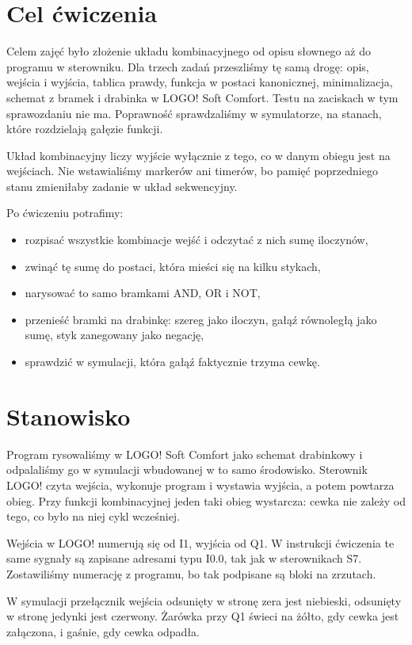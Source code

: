 \newpage
\section{Cel ćwiczenia}

Celem zajęć było złożenie układu kombinacyjnego od opisu słownego aż do programu w sterowniku. Dla trzech zadań przeszliśmy tę samą drogę: opis, wejścia i wyjścia, tablica prawdy, funkcja w postaci kanonicznej, minimalizacja, schemat z bramek i drabinka w LOGO! Soft Comfort. Testu na zaciskach w tym sprawozdaniu nie ma. Poprawność sprawdzaliśmy w symulatorze, na stanach, które rozdzielają gałęzie funkcji.

Układ kombinacyjny liczy wyjście wyłącznie z tego, co w danym obiegu jest na wejściach. Nie wstawialiśmy markerów ani timerów, bo pamięć poprzedniego stanu zmieniłaby zadanie w układ sekwencyjny.

Po ćwiczeniu potrafimy:

\begin{itemize}
    \item rozpisać wszystkie kombinacje wejść i odczytać z nich sumę iloczynów,
    \item zwinąć tę sumę do postaci, która mieści się na kilku stykach,
    \item narysować to samo bramkami AND, OR i NOT,
    \item przenieść bramki na drabinkę: szereg jako iloczyn, gałąź równoległą jako sumę, styk zanegowany jako negację,
    \item sprawdzić w symulacji, która gałąź faktycznie trzyma cewkę.
\end{itemize}

\section{Stanowisko}

Program rysowaliśmy w LOGO! Soft Comfort jako schemat drabinkowy i odpalaliśmy go w symulacji wbudowanej w to samo środowisko. Sterownik LOGO! czyta wejścia, wykonuje program i wystawia wyjścia, a potem powtarza obieg. Przy funkcji kombinacyjnej jeden taki obieg wystarcza: cewka nie zależy od tego, co było na niej cykl wcześniej.

Wejścia w LOGO! numerują się od I1, wyjścia od Q1. W instrukcji ćwiczenia te same sygnały są zapisane adresami typu I0.0, tak jak w sterownikach S7. Zostawiliśmy numerację z programu, bo tak podpisane są bloki na zrzutach.

W symulacji przełącznik wejścia odsunięty w stronę zera jest niebieski, odsunięty w stronę jedynki jest czerwony. Żarówka przy Q1 świeci na żółto, gdy cewka jest załączona, i gaśnie, gdy cewka odpadła.
